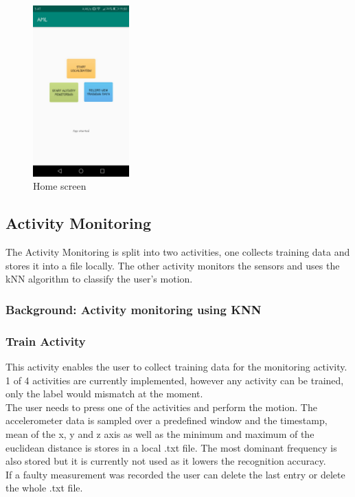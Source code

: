 \documentclass[12pt]{article}
\begin{document}
\begin{figure}
	\centering
	\includegraphics[width=140px]{images/main.jpeg}
	\caption{Home screen}
	\label{fig:main}
\end{figure}

\subsection{Activity Monitoring}\label{sec:activitymonitoring}
The Activity Monitoring is split into two activities, one collects training data and stores it into a file locally. The other activity monitors the sensors and uses the kNN algorithm to classify the user's motion.

\subsubsection{Background: Activity monitoring using KNN}

\subsubsection{Train Activity} \label{sec:train}
This activity enables the user to collect training data for the monitoring activity. 1 of 4 activities are currently implemented, however any activity can be trained, only the label would mismatch at the moment.
\\
The user needs to press one of the activities and perform the motion. The accelerometer data is sampled over a predefined window and the timestamp, mean of the x, y and z axis as well as the minimum and maximum of the euclidean distance is stores in a local .txt file. The most dominant frequency is also stored but it is currently not used as it lowers the recognition accuracy.
\\
If a faulty measurement was recorded the user can delete the last entry or delete the whole .txt file.
\end{document}
